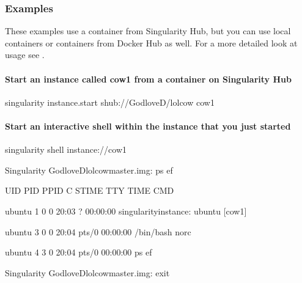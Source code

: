 \documentclass[letterpaper,10pt,english]{sphinxmanual}
\begin{document}
\subsubsection{Examples}
\label{\detokenize{appendix:id45}}
These examples use a container from Singularity Hub, but you can use
local containers or containers from Docker Hub as well. For a more
detailed look at  usage see {\hyperref[\detokenize{running_services:running-services}]{}}.


\paragraph{Start an instance called cow1 from a container on Singularity Hub}
\label{\detokenize{appendix:start-an-instance-called-cow1-from-a-container-on-singularity-hub}}
%
\begin{sphinxVerbatim}[commandchars=\\\{\}]
\PYGZdl{} singularity instance.start shub://GodloveD/lolcow cow1
\end{sphinxVerbatim}


\paragraph{Start an interactive shell within the instance that you just started}
\label{\detokenize{appendix:start-an-interactive-shell-within-the-instance-that-you-just-started}}
%
\begin{sphinxVerbatim}[commandchars=\\\{\}]
\PYGZdl{} singularity shell instance://cow1

Singularity GodloveD\PYGZhy{}lolcow\PYGZhy{}master.img:\PYGZti{}\PYGZgt{} ps \PYGZhy{}ef

UID        PID  PPID  C STIME TTY          TIME CMD

ubuntu       1     0  0 20:03 ?        00:00:00 singularity\PYGZhy{}instance: ubuntu [cow1]

ubuntu       3     0  0 20:04 pts/0    00:00:00 /bin/bash \PYGZhy{}\PYGZhy{}norc

ubuntu       4     3  0 20:04 pts/0    00:00:00 ps \PYGZhy{}ef

Singularity GodloveD\PYGZhy{}lolcow\PYGZhy{}master.img:\PYGZti{}\PYGZgt{} exit
\end{sphinxVerbatim}
\end{document}
